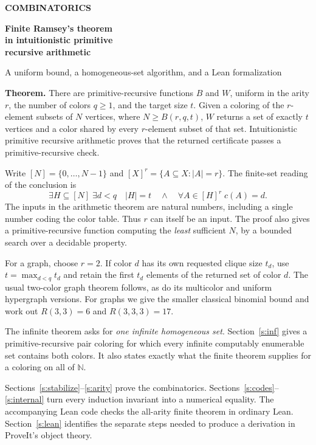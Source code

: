 \documentclass[11pt,letterpaper]{article}
\newcommand{\N}{\mathbb N}
\newcommand{\point}[1]{\par\smallskip{\bfseries\color{ink}#1.}\enspace}
\begin{document}
\thispagestyle{first}
{\color{accent}\sffamily\bfseries COMBINATORICS}\par
\vspace{4pt}
{\fontsize{25}{29}\selectfont\bfseries\color{ink} Finite Ramsey's theorem\\[1pt] in intuitionistic primitive\\[1pt] recursive arithmetic\par}
\vspace{4pt}
{\large A uniform bound, a homogeneous-set algorithm, and a Lean formalization\par}
\vspace{8pt}
\textbf{Theorem.} There are primitive-recursive functions $B$ and $W$, uniform in the arity $r$, the number of colors $q\ge1$, and the target size $t$. Given a coloring of the $r$-element subsets of $N$ vertices, where $N\ge B(r,q,t)$, $W$ returns a set of exactly $t$ vertices and a color shared by every $r$-element subset of that set. Intuitionistic primitive recursive arithmetic proves that the returned certificate passes a primitive-recursive check.

Write $[N]=\{0,\ldots,N-1\}$ and $[X]^r=\{A\subseteq X:|A|=r\}$. The finite-set reading of the conclusion is
\[
  \exists H\subseteq[N]\;\exists d<q\quad
       |H|=t\quad\land\quad \forall A\in[H]^r\; c(A)=d .
\]
The inputs in the arithmetic theorem are natural numbers, including a single number coding the color table. Thus $r$ can itself be an input. The proof also gives a primitive-recursive function computing the \emph{least} sufficient $N$, by a bounded search over a decidable property.

For a graph, choose $r=2$. If color $d$ has its own requested clique size $t_d$, use $t=\max_{d<q}t_d$ and retain the first $t_d$ elements of the returned set of color $d$. The usual two-color graph theorem follows, as do its multicolor and uniform hypergraph versions. For graphs we give the smaller classical binomial bound and work out $R(3,3)=6$ and $R(3,3,3)=17$.

The infinite theorem asks for \emph{one infinite homogeneous set}. Section~\ref{s:inf} gives a primitive-recursive pair coloring for which every infinite computably enumerable set contains both colors. It also states exactly what the finite theorem supplies for a coloring on all of $\N$.

\point{Proof and verification} Sections~\ref{s:stabilize}--\ref{s:arity} prove the combinatorics. Sections~\ref{s:codes}--\ref{s:internal} turn every induction invariant into a numerical equality. The accompanying Lean code checks the all-arity finite theorem in ordinary Lean. Section~\ref{s:lean} identifies the separate steps needed to produce a derivation in ProveIt's object theory.
\clearpage
\end{document}
